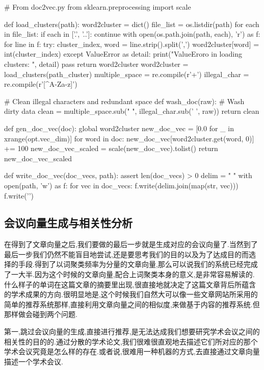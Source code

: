 \begin{python}
# From doc2vec.py
from sklearn.preprocessing import scale


def load_clusters(path):    
    word2cluster = dict()
    file_list = os.listdir(path)
    for each in file_list:
        if each in ['.', '..']: continue
        with open(os.path.join(path, each), 'r') as f:
            for line in f:
                try:
                    cluster_index, word = line.strip().split(',')
                    word2cluster[word] = int(cluster_index)
                except ValueError as detail:
                    print("ValueEroro in loading clusters: ", detail)
                    pass
    return word2cluster
word2cluster = load_clusters(path_cluster)
multiple_space = re.compile(r'\s+')
illegal_char = re.compile(r'[^A-Za-z]')

# Clean illegal characters and redundant space
def wash_doc(raw):
    # Wash dirty data    
    clean = multiple_space.sub(" ", illegal_char.sub(' ', raw))
    return clean

def gen_doc_vec(doc):
    global word2cluster
    new_doc_vec = [0.0 for _ in xrange(opt.vec_dim)]
    for word in doc:
        new_doc_vec[word2cluster.get(word, 0)] += 100
    new_doc_vec_scaled = scale(new_doc_vec).tolist()
    return new_doc_vec_scaled

def write_doc_vec(doc_vecs, path):
    assert len(doc_vecs) > 0
    delim = " "
    with open(path, 'w') as f:
        for vec in doc_vecs:
            f.write(delim.join(map(str, vec)))
            f.write('\n')

\end{python}


\subsection{会议向量生成与相关性分析}

在得到了文章向量之后,我们要做的最后一步就是生成对应的会议向量了.当然到了最后一步我们仍然不能盲目地尝试,还是要思考我们的目的以及为了达成目的而选择的手段.得到了以词聚类频率为分量的文章向量,那么可以说我们的系统已经完成了一大半.因为这个时候的文章向量,配合上词聚类本身的意义,是非常容易解读的.什么样子的单词在这篇文章的摘要里出现,很直接地就决定了这篇文章背后所蕴含的学术成果的方向.很明显地是,这个时候我们自然大可以像一些文章网站所采用的简单的推荐系统那样,直接利用文章向量之间的相似度,来做基于内容的推荐系统.但那样做会碰到两个问题.

第一,跳过会议向量的生成,直接进行推荐,是无法达成我们想要研究学术会议之间的相关性的目的的.通过分散的学术论文,我们很难很直观地去描述它们所对应的那个学术会议究竟是怎么样的存在.或者说,很难用一种机器的方式,去直接通过文章向量描述一个学术会议.

